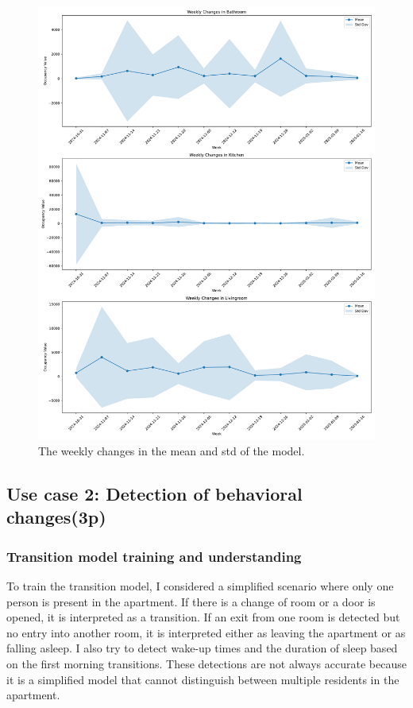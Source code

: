 \documentclass[A4,10pt]{article}
\begin{document}
\begin{figure}[H]
	\centering
	\includegraphics[width=1.15\textwidth]{weekly_changes.pdf}
	\caption{The weekly changes in the mean and std of the model.}
	\label{fig:detected_emergencies}
\end{figure}

\subsection{ Use case 2: Detection of behavioral changes(3p)}

\subsubsection{Transition model training and understanding}

To train the transition model, I considered a simplified scenario where only one person is present in the apartment. If there is a change of room or a door is opened, it is interpreted as a transition. If an exit from one room is detected but no entry into another room, it is interpreted either as leaving the apartment or as falling asleep. I also try to detect wake-up times and the duration of sleep based on the first morning transitions. These detections are not always accurate because it is a simplified model that cannot distinguish between multiple residents in the apartment.
\end{document}
